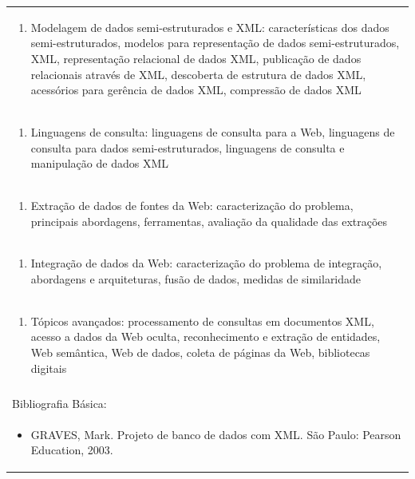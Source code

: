 \documentclass[11pt]{article}
\begin{document}
\begin{center}
\begin{longtable}{|p{4cm}|p{4cm}|p{4cm}|p{4cm}|}
\multicolumn{4}{|p{\dimexpr 16cm + 6\tabcolsep\relax}|}{\begin{enumerate}[start=2]\item Modelagem de dados semi-estruturados e XML: características dos dados semi-estruturados, modelos para representação de dados semi-estruturados, XML, representação relacional de dados XML, publicação de dados relacionais através de XML, descoberta de estrutura de dados XML, acessórios para gerência de dados XML, compressão de dados XML\end{enumerate}}\\
\multicolumn{4}{|p{\dimexpr 16cm + 6\tabcolsep\relax}|}{\begin{enumerate}[start=3]\item Linguagens de consulta: linguagens de consulta para a Web, linguagens de consulta para dados semi-estruturados, linguagens de consulta e manipulação de dados XML\end{enumerate}}\\
\multicolumn{4}{|p{\dimexpr 16cm + 6\tabcolsep\relax}|}{\begin{enumerate}[start=4]\item Extração de dados de fontes da Web: caracterização do problema, principais abordagens, ferramentas, avaliação da qualidade das extrações\end{enumerate}}\\
\multicolumn{4}{|p{\dimexpr 16cm + 6\tabcolsep\relax}|}{\begin{enumerate}[start=5]\item Integração de dados da Web: caracterização do problema de integração, abordagens e arquiteturas, fusão de dados, medidas de similaridade\end{enumerate}}\\
\multicolumn{4}{|p{\dimexpr 16cm + 6\tabcolsep\relax}|}{\begin{enumerate}[start=6]\item Tópicos avançados: processamento de consultas em documentos XML, acesso a dados da Web oculta, reconhecimento e extração de entidades, Web semântica, Web de dados, coleta de páginas da Web, bibliotecas digitais\end{enumerate}}\\
\multicolumn{4}{|p{\dimexpr 16cm + 6\tabcolsep\relax}|}{}\\
\hline
\multicolumn{4}{|p{16cm}|}{Bibliografia Básica:}\\*
\multicolumn{4}{|p{\dimexpr 16cm + 6\tabcolsep\relax}|}{\begin{itemize}\item GRAVES, Mark. Projeto de banco de dados com XML. São Paulo: Pearson Education, 2003.\end{itemize}}\\

\end{longtable}
\end{center}
\end{document}
